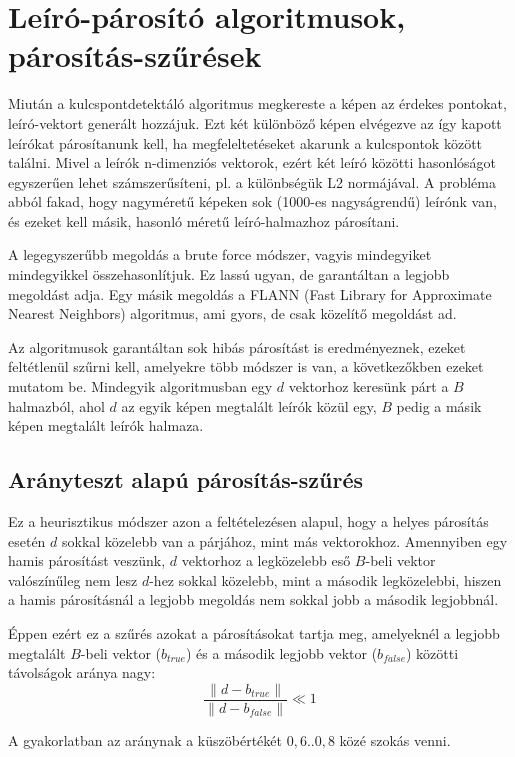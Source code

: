 \documentclass{article}
\begin{document}
	\newpage
	\section{Leíró-párosító algoritmusok, párosítás-szűrések}
	Miután a kulcspontdetektáló algoritmus megkereste a képen az érdekes pontokat, leíró-vektort generált hozzájuk. Ezt két különböző képen elvégezve az így kapott leírókat párosítanunk kell, ha megfeleltetéseket akarunk a kulcspontok között találni. Mivel a leírók  n-dimenziós vektorok, ezért két leíró közötti hasonlóságot egyszerűen lehet számszerűsíteni, pl. a különbségük L2 normájával. A probléma abból fakad, hogy nagyméretű képeken sok (1000-es nagyságrendű) leírónk van, és ezeket kell másik, hasonló méretű leíró-halmazhoz párosítani.
	
	A legegyszerűbb megoldás a brute force módszer, vagyis mindegyiket mindegyikkel összehasonlítjuk. Ez lassú ugyan, de garantáltan a legjobb megoldást adja. Egy másik megoldás a FLANN (Fast Library for Approximate Nearest Neighbors) algoritmus, ami gyors, de csak közelítő megoldást ad.
	
	Az algoritmusok garantáltan sok hibás párosítást is eredményeznek, ezeket feltétlenül szűrni kell, amelyekre több módszer is van, a következőkben ezeket mutatom be. Mindegyik algoritmusban egy $d$ vektorhoz keresünk párt a $B$ halmazból, ahol $d$ az egyik képen megtalált leírók közül egy, $B$ pedig a másik képen megtalált leírók halmaza.
	
	\subsection{Arányteszt alapú párosítás-szűrés}
	Ez a heurisztikus módszer azon a feltételezésen alapul, hogy a helyes párosítás esetén $d$ sokkal közelebb van a párjához, mint más vektorokhoz. Amennyiben egy hamis párosítást veszünk, $d$ vektorhoz a legközelebb eső $B$-beli vektor valószínűleg nem lesz $d$-hez sokkal közelebb, mint a második legközelebbi, hiszen a hamis párosításnál a legjobb megoldás nem sokkal jobb a második legjobbnál.
	
	Éppen ezért ez a szűrés azokat a párosításokat tartja meg, amelyeknél a legjobb megtalált $B$-beli vektor ($b_{true}$) és a második legjobb vektor ($b_{false}$) közötti távolságok aránya nagy:
	\begin{equation}
	\frac{\|d-b_{true}\|}{\|d-b_{false}\|}\ll 1
	\end{equation}
	
	A gyakorlatban az aránynak a küszöbértékét $0,6..0,8$ közé szokás venni.
	
\end{document}
